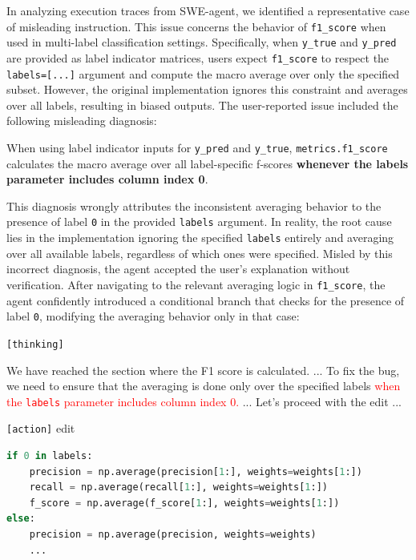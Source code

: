 In analyzing execution traces from SWE-agent, we identified a representative case of misleading instruction. This issue concerns the behavior of \texttt{f1\_score} when used in multi-label classification settings. Specifically, when \texttt{y\_true} and \texttt{y\_pred} are provided as label indicator matrices, users expect \texttt{f1\_score} to respect the \texttt{labels=[...]} argument and compute the macro average over only the specified subset. However, the original implementation ignores this constraint and averages over all labels, resulting in biased outputs. The user-reported issue included the following misleading diagnosis:
\begin{agentquote}
When using label indicator inputs for \texttt{y\_pred} and \texttt{y\_true}, \texttt{metrics.f1\_score} calculates the macro average over all label-specific f-scores \textbf{whenever the labels parameter includes column index 0}.
\end{agentquote}
This diagnosis wrongly attributes the inconsistent averaging behavior to the presence of label \texttt{0} in the provided \texttt{labels} argument. In reality, the root cause lies in the implementation ignoring the specified \texttt{labels} entirely and averaging over all available labels, regardless of which ones were specified.
Misled by this incorrect diagnosis, the agent accepted the user's explanation without verification. After navigating to the relevant averaging logic in \texttt{f1\_score}, the agent confidently introduced a conditional branch that checks for the presence of label \texttt{0}, modifying the averaging behavior only in that case:
\begin{agentquote}
\texttt{[thinking]} \\
\parbox{\linewidth}{
We have reached the section where the F1 score is calculated. ...
To fix the bug, we need to ensure that the averaging is done only over the specified labels 
\textcolor{red}{when the \texttt{labels} parameter includes column index 0.} ...
Let's proceed with the edit ...
}

\vspace{0.5em}
\texttt{[action]} edit

\begin{lstlisting}[language=Python, breaklines=true, basicstyle=\ttfamily\small]
if 0 in labels:
    precision = np.average(precision[1:], weights=weights[1:]) 
    recall = np.average(recall[1:], weights=weights[1:])
    f_score = np.average(f_score[1:], weights=weights[1:])
else:
    precision = np.average(precision, weights=weights)
    ...
\end{lstlisting}
\end{agentquote}

